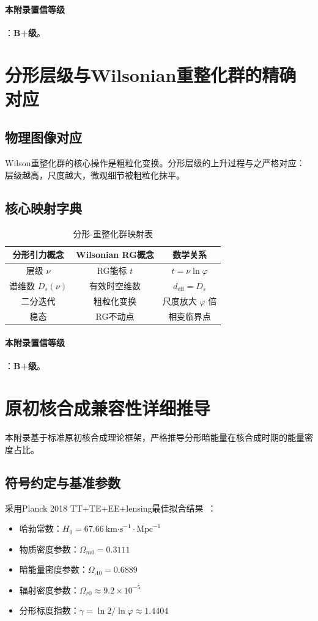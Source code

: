 \documentclass[12pt,a4paper,twocolumn]{article}
\renewcommand{\phi}{\varphi}
\begin{document}
\paragraph{本附录置信等级}：\textbf{B+级}。

\section{分形层级与Wilsonian重整化群的精确对应}
\label{app:rg_mapping}

\subsection{物理图像对应}
Wilson重整化群的核心操作是粗粒化变换。分形层级的上升过程与之严格对应：层级越高，尺度越大，微观细节被粗粒化抹平。

\subsection{核心映射字典}
\begin{table}[H]
\centering
\footnotesize
\caption{分形-重整化群映射表}
\begin{tabular}{c|c|c}
\hline
\textbf{分形引力概念} & \textbf{Wilsonian RG概念} & \textbf{数学关系} \\
\hline
层级 $\nu$ & RG能标 $t$ & $t=\nu\ln\phi$ \\
谱维数 $D_s(\nu)$ & 有效时空维数 & $d_{\text{eff}}=D_s$ \\
二分迭代 & 粗粒化变换 & 尺度放大 $\phi$ 倍 \\
稳态 & RG不动点 & 相变临界点 \\
\hline
\end{tabular}
\end{table}

\paragraph{本附录置信等级}：\textbf{B+级}。

\section{原初核合成兼容性详细推导}
\label{app:bbn}

本附录基于标准原初核合成理论框架，严格推导分形暗能量在核合成时期的能量密度占比。

\subsection{符号约定与基准参数}
采用Planck 2018 TT+TE+EE+lensing最佳拟合结果~\cite{Planck2020}：
\begin{itemize}
\item 哈勃常数：$H_0 = 67.66\ \text{km·s}^{-1}·\text{Mpc}^{-1}$
\item 物质密度参数：$\Omega_{m0} = 0.3111$
\item 暗能量密度参数：$\Omega_{\Lambda0} = 0.6889$
\item 辐射密度参数：$\Omega_{r0} \approx 9.2\times10^{-5}$
\item 分形标度指数：$\gamma = \ln2/\ln\phi \approx 1.4404$
\end{itemize}
\end{document}
